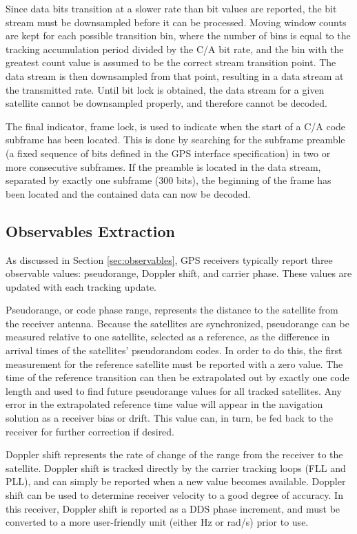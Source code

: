 \documentclass[12pt]{article}
\begin{document}
Since data bits transition at a slower rate than bit values are reported, the bit stream must be downsampled before it can be processed. Moving window counts are kept for each possible transition bin, where the number of bins is equal to the tracking accumulation period divided by the C/A bit rate, and the bin with the greatest count value is assumed to be the correct stream transition point. The data stream is then downsampled from that point, resulting in a data stream at the transmitted rate. Until bit lock is obtained, the data stream for a given satellite cannot be downsampled properly, and therefore cannot be decoded.

The final indicator, frame lock, is used to indicate when the start of a C/A code subframe has been located. This is done by searching for the subframe preamble (a fixed sequence of bits defined in the GPS interface specification) in two or more consecutive subframes. If the preamble is located in the data stream, separated by exactly one subframe (300 bits), the beginning of the frame has been located and the contained data can now be decoded.

\subsection{Observables Extraction}
As discussed in Section \ref{sec:observables}, GPS receivers typically report three observable values: pseudorange, Doppler shift, and carrier phase. These values are updated with each tracking update.

Pseudorange, or code phase range, represents the distance to the satellite from the receiver antenna. Because the satellites are synchronized, pseudorange can be measured relative to one satellite, selected as a reference, as the difference in arrival times of the satellites' pseudorandom codes. In order to do this, the first measurement for the reference satellite must be reported with a zero value. The time of the reference transition can then be extrapolated out by exactly one code length and used to find future pseudorange values for all tracked satellites. Any error in the extrapolated reference time value will appear in the navigation solution as a receiver bias or drift. This value can, in turn, be fed back to the receiver for further correction if desired.

Doppler shift represents the rate of change of the range from the receiver to the satellite. Doppler shift is tracked directly by the carrier tracking loops (FLL and PLL), and can simply be reported when a new value becomes available. Doppler shift can be used to determine receiver velocity to a good degree of accuracy. In this receiver, Doppler shift is reported as a DDS phase increment, and must be converted to a more user-friendly unit (either Hz or rad/s) prior to use.
\end{document}
